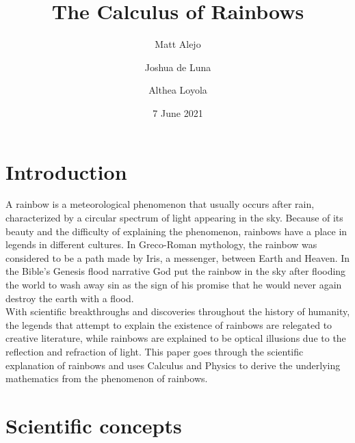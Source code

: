 \documentclass[a4paper,12pt]{article}
\title{The Calculus of Rainbows}
\author{
Matt Alejo
\and
Joshua de Luna
\and
Althea Loyola
}
\date{7 June 2021}
\begin{document}



\maketitle

\tableofcontents

\section{Introduction}

A rainbow is a meteorological phenomenon that usually occurs after rain, characterized by a circular spectrum of light appearing in the sky. Because of its beauty and the difficulty of explaining the phenomenon, rainbows have a place in legends in different cultures. In Greco-Roman mythology, the rainbow was considered to be a path made by Iris, a messenger, between Earth and Heaven. In the Bible's Genesis flood narrative God put the rainbow in the sky after flooding the world to wash away sin as the sign of his promise that he would never again destroy the earth with a flood.\\

With scientific breakthroughs and discoveries throughout the history of humanity, the legends that attempt to explain the existence of rainbows are relegated to creative literature, while rainbows are explained to be optical illusions due to the reflection and refraction of light. This paper goes through the scientific explanation of rainbows and uses Calculus and Physics to derive the underlying mathematics from the phenomenon of rainbows.

\section{Scientific concepts}
\end{document}
